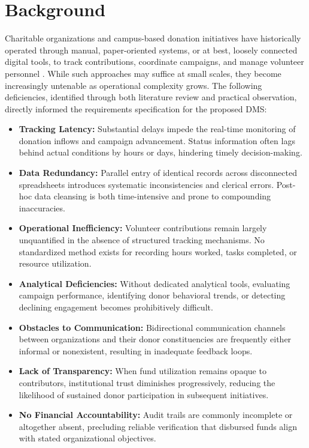 \documentclass{thesis-library}
\begin{document}
\section{Background}
Charitable organizations and campus-based donation initiatives have historically operated through manual, paper-oriented systems, or at best, loosely connected digital tools, to track contributions, coordinate campaigns, and manage volunteer personnel \cite{sander2021digital,rathore2021volunteer}. While such approaches may suffice at small scales, they become increasingly untenable as operational complexity grows. The following deficiencies, identified through both literature review and practical observation, directly informed the requirements specification for the proposed DMS:

\begin{itemize}
    \item \textbf{Tracking Latency:} Substantial delays impede the real-time monitoring of donation inflows and campaign advancement. Status information often lags behind actual conditions by hours or days, hindering timely decision-making.
    \item \textbf{Data Redundancy:} Parallel entry of identical records across disconnected spreadsheets introduces systematic inconsistencies and clerical errors. Post-hoc data cleansing is both time-intensive and prone to compounding inaccuracies.
    \item \textbf{Operational Inefficiency:} Volunteer contributions remain largely unquantified in the absence of structured tracking mechanisms. No standardized method exists for recording hours worked, tasks completed, or resource utilization.
    \item \textbf{Analytical Deficiencies:} Without dedicated analytical tools, evaluating campaign performance, identifying donor behavioral trends, or detecting declining engagement becomes prohibitively difficult.
    \item \textbf{Obstacles to Communication:} Bidirectional communication channels between organizations and their donor constituencies are frequently either informal or nonexistent, resulting in inadequate feedback loops.
    \item \textbf{Lack of Transparency:} When fund utilization remains opaque to contributors, institutional trust diminishes progressively, reducing the likelihood of sustained donor participation in subsequent initiatives.
    \item \textbf{No Financial Accountability:} Audit trails are commonly incomplete or altogether absent, precluding reliable verification that disbursed funds align with stated organizational objectives.

\end{itemize}
\end{document}

